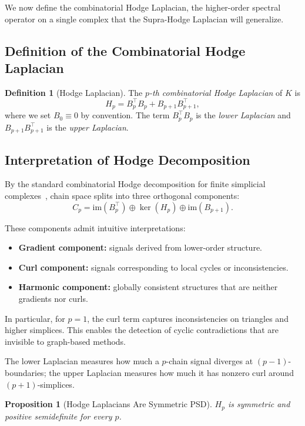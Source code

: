 \documentclass[11pt]{article}
\newtheorem{proposition}[theorem]{Proposition}
\theoremstyle{definition}
\newtheorem{definition}[theorem]{Definition}
\theoremstyle{remark}
\begin{document}
We now define the combinatorial Hodge Laplacian, the higher-order spectral
operator on a single complex that the Supra-Hodge Laplacian will generalize.

\subsection{Definition of the Combinatorial Hodge Laplacian}

\begin{definition}[Hodge Laplacian]
The \emph{$p$-th combinatorial Hodge Laplacian} of $K$ is
\[
  H_p = B_p^\top B_p + B_{p+1}B_{p+1}^\top,
\]
where we set $B_0\equiv 0$ by convention. The term $B_p^\top B_p$ is the
\emph{lower Laplacian} and $B_{p+1}B_{p+1}^\top$ is the \emph{upper Laplacian}.
\end{definition}

\subsection{Interpretation of Hodge Decomposition}

By the standard combinatorial Hodge decomposition for finite simplicial
complexes~\cite{horak2013,schaub2020,lim2020}, chain space splits into three
orthogonal components:
\[
C_p = \mathrm{im}(B_p^\top) \oplus \ker(H_p) \oplus \mathrm{im}(B_{p+1}).
\]

These components admit intuitive interpretations:
\begin{itemize}
    \item \textbf{Gradient component:} signals derived from lower-order structure.
    \item \textbf{Curl component:} signals corresponding to local cycles or inconsistencies.
    \item \textbf{Harmonic component:} globally consistent structures that are neither gradients nor curls.
\end{itemize}

In particular, for $p = 1$, the curl term captures inconsistencies on triangles and higher simplices. This enables the detection of cyclic contradictions that are invisible to graph-based methods.

The lower Laplacian measures how much a $p$-chain signal diverges at
$(p-1)$-boundaries; the upper Laplacian measures how much it has nonzero curl
around $(p+1)$-simplices.

\begin{proposition}[Hodge Laplacians Are Symmetric PSD]
\label{prop:hodge_psd}
$H_p$ is symmetric and positive semidefinite for every $p$.
\end{proposition}
\end{document}
